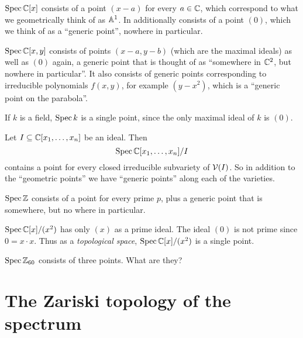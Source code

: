 \begin{example}
	\listhack
	\begin{enumerate}[(a)]
		\ii $\operatorname{Spec} \mathbb C[x]$ consists of a point $(x-a)$ for every $a \in \mathbb C$,
		which correspond to what we geometrically think of as $\mathbb A^1$.
		In additionally consists of a point $(0)$,
		which we think of as a ``generic point'', nowhere in particular.

		\ii $\operatorname{Spec} \mathbb C[x,y]$ consists of points $(x-a,y-b)$
		(which are the maximal ideals) as well as $(0)$ again, a generic
		point that is thought of as ``somewhere in $\mathbb C^2$,
		but nowhere in particular''.
		It also consists of generic points corresponding to irreducible
		polynomials $f(x,y)$, for example $(y-x^2)$,
		which is a ``generic point on the parabola''.

		\ii If $k$ is a field, $\operatorname{Spec} k$ is a single point,
		since the only maximal ideal of $k$ is $(0)$.
	\end{enumerate}
\end{example}
\begin{example}
	Let $I \subseteq \mathbb C[x_1, \dots, x_n]$ be an ideal.
	Then \[ \operatorname{Spec} \mathbb C[x_1, \dots, x_n] /I \] contains a
	point for every closed irreducible subvariety of $\mathcal V(I)$.
	So in addition to the ``geometric points'' we have
	``generic points'' along each of the varieties.
\end{example}
\begin{example}
	\listhack
	\begin{enumerate}[(a)]
		\ii $\operatorname{Spec} \mathbb Z$ consists of a point for every prime $p$,
		plus a generic point that is somewhere, but no where in particular.

		\ii $\operatorname{Spec} \mathbb C[x] / (x^2)$ has only $(x)$ as a prime ideal.
		The ideal $(0)$ is not prime since $0 = x \cdot x$.
		Thus as a \emph{topological space},
		$\operatorname{Spec} \mathbb C[x] / (x^2)$ is a single point.
		
		\ii $\operatorname{Spec} \mathbb Z_{60}$ consists of three points.
		What are they?
	\end{enumerate}
\end{example}

\section{The Zariski topology of the spectrum}

